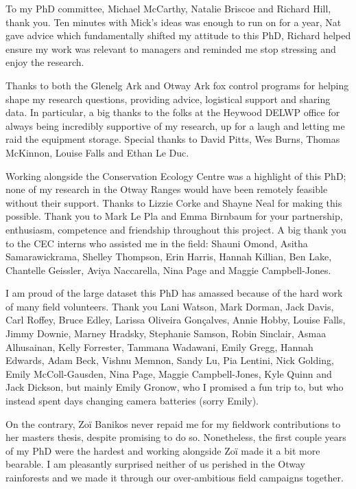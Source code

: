\documentclass[11pt,a4paper,titlepage,twoside,openright]{style/unimelbthesis}
\begin{document}
\begin{frontmatter}
\begin{acknowledgements}
    To my PhD committee, Michael McCarthy, Natalie Briscoe and Richard Hill, thank you. Ten minutes with Mick's ideas was enough to run on for a year, Nat gave advice which fundamentally shifted my attitude to this PhD, Richard helped ensure my work was relevant to managers and reminded me stop stressing and enjoy the research.

    Thanks to both the Glenelg Ark and Otway Ark fox control programs for helping shape my research questions, providing advice, logistical support and sharing data. In particular, a big thanks to the folks at the Heywood DELWP office for always being incredibly supportive of my research, up for a laugh and letting me raid the equipment storage. Special thanks to David Pitts, Wes Burns, Thomas McKinnon, Louise Falls and Ethan Le Duc.

    Working alongside the Conservation Ecology Centre was a highlight of this PhD; none of my research in the Otway Ranges would have been remotely feasible without their support. Thanks to Lizzie Corke and Shayne Neal for making this possible. Thank you to Mark Le Pla and Emma Birnbaum for your partnership, enthusiasm, competence and friendship throughout this project. A big thank you to the CEC interns who assisted me in the field: Shauni Omond, Asitha Samarawickrama, Shelley Thompson, Erin Harris, Hannah Killian, Ben Lake, Chantelle Geissler, Aviya Naccarella, Nina Page and Maggie Campbell-Jones.

    I am proud of the large dataset this PhD has amassed because of the hard work of many field volunteers. Thank you Lani Watson, Mark Dorman, Jack Davis, Carl Roffey, Bruce Edley, Larissa Oliveira Gonçalves, Annie Hobby, Louise Falls, Jimmy Downie, Marney Hradsky, Stephanie Samson, Robin Sinclair, Asmaa Alhusainan, Kelly Forrester, Tammana Wadawani, Emily Gregg, Hannah Edwards, Adam Beck, Vishnu Memnon, Sandy Lu, Pia Lentini, Nick Golding, Emily McColl-Gausden, Nina Page, Maggie Campbell-Jones, Kyle Quinn and Jack Dickson, but mainly Emily Gronow, who I promised a fun trip to, but who instead spent days changing camera batteries (sorry Emily).

    On the contrary, Zoï Banikos never repaid me for my fieldwork contributions to her masters thesis, despite promising to do so. Nonetheless, the first couple years of my PhD were the hardest and working alongside Zoï made it a bit more bearable. I am pleasantly surprised neither of us perished in the Otway rainforests and we made it through our over-ambitious field campaigns together.


\end{acknowledgements}
\end{frontmatter}
\end{document}
